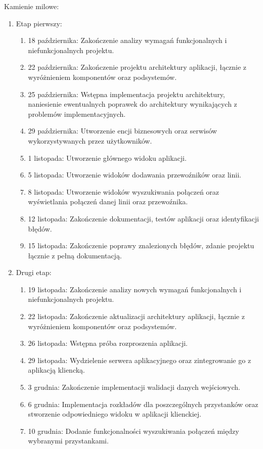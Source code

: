 \documentclass[10pt,a4paper]{article}
\begin{document}
\newpage
\noindent
Kamienie milowe:
\begin{enumerate}
	\bfseries
	\item Etap pierwszy:
	\begin{enumerate}
		\mdseries
		\item 18 października: Zakończenie analizy wymagań funkcjonalnych i niefunkcjonalnych projektu.
		\item 22 października: Zakończenie projektu architektury aplikacji, łącznie z wyróżnieniem komponentów oraz podsystemów.
		\item 25 października: Wstępna implementacja projektu architektury, naniesienie ewentualnych poprawek do architektury wynikających z problemów implementacyjnych.
		\item 29 października: Utworzenie encji biznesowych oraz serwisów wykorzystywanych przez użytkowników.
		\item 1 listopada: Utworzenie głównego widoku aplikacji.
		\item 5 listopada: Utworzenie widoków dodawania przewoźników oraz linii.
		\item 8 listopada: Utworzenie widoków wyszukiwania połączeń oraz wyświetlania połączeń danej linii oraz przewoźnika.
		\item 12 listopada: Zakończenie dokumentacji, testów aplikacji oraz identyfikacji błędów.
		\item 15 listopada: Zakończenie poprawy znalezionych błędów, zdanie projektu łącznie z pełną dokumentacją.
	\end{enumerate}
	\item Drugi etap:
	\begin{enumerate}
		\mdseries
		\item 19 listopada: Zakończenie analizy nowych wymagań funkcjonalnych i niefunkcjonalnych projektu.
		\item 22 listopada: Zakończenie aktualizacji architektury aplikacji, łącznie z wyróżnieniem komponentów oraz podsystemów.
		\item 26 listopada: Wstępna próba rozproszenia aplikacji.
		\item 29 listopada: Wydzielenie serwera aplikacyjnego oraz zintegrowanie go z aplikacją kliencką.
		\item 3 grudnia: Zakończenie implementacji walidacji danych wejściowych.
		\item 6 grudnia: Implementacja rozkładów dla poszczególnych przystanków oraz stworzenie odpowiedniego widoku w aplikacji klienckiej.
		\item 10 grudnia: Dodanie funkcjonalności wyszukiwania połączeń między wybranymi przystankami.

\end{enumerate}
\end{enumerate}
\end{document}
